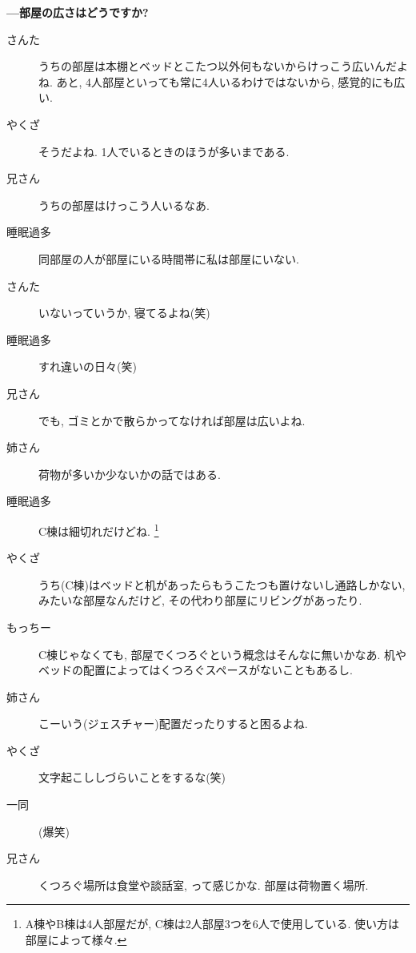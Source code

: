 \documentclass[10pt,b5jsbook,dvips,dvipdfmx,openany]{jsbook}
\theoremstyle{definition}
\begin{document}
\begin{multicols}{2}
		\textbf{---部屋の広さはどうですか? }
		\begin{description}
		\item[さんた]うちの部屋は本棚とベッドとこたつ以外何もないからけっこう広いんだよね. あと, 4人部屋といっても常に4人いるわけではないから, 感覚的にも広い. 
		\item[やくざ]そうだよね. 1人でいるときのほうが多いまである. 
		\item[兄さん]うちの部屋はけっこう人いるなあ. 
		\item[睡眠過多]同部屋の人が部屋にいる時間帯に私は部屋にいない. 
		\item[さんた]いないっていうか, 寝てるよね(笑)
		\item[睡眠過多]すれ違いの日々(笑)
		\item[兄さん]でも, ゴミとかで散らかってなければ部屋は広いよね. 
		\item[姉さん]荷物が多いか少ないかの話ではある. 
		\item[睡眠過多]C棟は細切れだけどね. \footnote{A棟やB棟は4人部屋だが, C棟は2人部屋3つを6人で使用している. 使い方は部屋によって様々. }
		\item[やくざ]うち(C棟)はベッドと机があったらもうこたつも置けないし通路しかない, みたいな部屋なんだけど, その代わり部屋にリビングがあったり. 
		\item[もっちー]C棟じゃなくても, 部屋でくつろぐという概念はそんなに無いかなあ. 机やベッドの配置によってはくつろぐスペースがないこともあるし. 
		\item[姉さん]こーいう(ジェスチャー)配置だったりすると困るよね. 
		\item[やくざ]文字起こししづらいことをするな(笑)
		\item[ 一同 ](爆笑)
		\item[兄さん]くつろぐ場所は食堂や談話室, って感じかな. 部屋は荷物置く場所. 
		\end{description}


\end{multicols}
\end{document}
